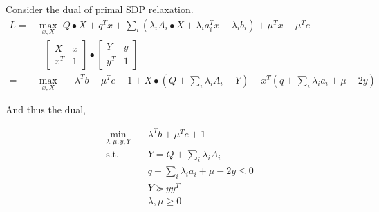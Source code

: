 \begin{frame}
  Consider the dual of primal SDP relaxation.
  \begin{equation}
    \begin{aligned}
      L = & \max_{x, X} \; Q\bullet X + q^Tx + \sum_i \left( \lambda_i A_i \bullet X  + \lambda_i a_i^Tx - \lambda_i b_i \right ) + \mu^Tx - \mu^Te \\
          & - \begin{bmatrix}X & x \\ x^T & 1\end{bmatrix} \bullet \begin{bmatrix}Y & y \\ y^T & 1\end{bmatrix}                                                                           \\
      =   & \max_{x, X} \; - \lambda^Tb - \mu^Te - 1+X\bullet (Q + \sum_i\lambda_iA_i - Y) + x^T(q + \sum_i \lambda_i a_i + \mu - 2 y)
    \end{aligned}
  \end{equation}

  And thus the dual,

  \begin{equation}
    \begin{aligned}
      \min_{\lambda, \mu, y, Y}\quad & \lambda^Tb + \mu^Te + 1                    \\
      \mathrm{s.t.} \quad            & Y = Q + \sum_i \lambda_i A_i               \\
                                     & q + \sum_i \lambda_i a_i + \mu - 2 y \le 0 \\
                                     & Y \succeq yy^T                             \\
                                     & \lambda, \mu \ge 0
    \end{aligned}
  \end{equation}
\end{frame}

\begin{frame}
  \scriptsize
  \printbibliography
\end{frame}


